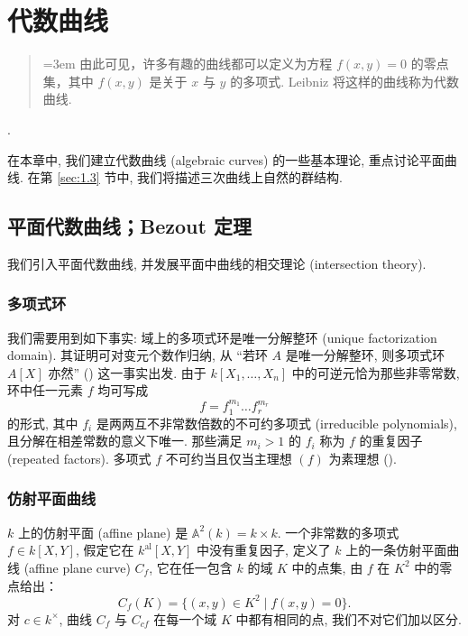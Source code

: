\chapter{代数曲线}\label{ch:1}

\begin{quote}\small\itshape
{\emergencystretch=3em 由此可见，许多有趣的曲线都可以定义为方程 $f(x,y)=0$ 的零点集，其中 $f(x,y)$ 是关于 $x$ 与 $y$ 的多项式. Leibniz 将这样的曲线称为代数曲线.\par}
\end{quote}
\vspace{-0.5em}
\hfill \small \cite[p.~78]{brieskorn1986}.

在本章中, 我们建立代数曲线 (algebraic curves) 的一些基本理论, 重点讨论平面曲线. 在第 \ref{sec:1.3} 节中, 我们将描述三次曲线上自然的群结构.

\section{平面代数曲线；Bezout 定理}\label{sec:1.1}

我们引入平面代数曲线, 并发展平面中曲线的相交理论 (intersection theory).

\subsection*{多项式环}

我们需要用到如下事实: 域上的多项式环是唯一分解整环 (unique factorization domain). 其证明可对变元个数作归纳, 从 ``若环 $A$ 是唯一分解整环, 则多项式环 $A[X]$ 亦然'' (\cite[4.9]{milne-ca}) 这一事实出发. 由于 $k[X_1,\dots,X_n]$ 中的可逆元恰为那些非零常数, 环中任一元素 $f$ 均可写成
\[
f = f_1^{m_1}\dots f_r^{m_r}
\]
的形式, 其中 $f_i$ 是两两互不非常数倍数的不可约多项式 (irreducible polynomials), 且分解在相差常数的意义下唯一. 那些满足 $m_i > 1$ 的 $f_i$ 称为 $f$ 的重复因子 (repeated factors). 多项式 $f$ 不可约当且仅当主理想 $(f)$ 为素理想 (\cite[4.1]{milne-ca}).

\subsection*{仿射平面曲线}

$k$ 上的仿射平面 (affine plane) 是 $\mathbb{A}^2(k) = k\times k$. 一个非常数的多项式 $f\in k[X,Y]$, 假定它在 $k^{\mathrm{al}}[X,Y]$ 中没有重复因子, 定义了 $k$ 上的一条仿射平面曲线 (affine plane curve) $C_f$, 它在任一包含 $k$ 的域 $K$ 中的点集, 由 $f$ 在 $K^2$ 中的零点给出：
\[
C_f(K) = \{(x,y)\in K^2 \mid f(x,y) = 0\}.
\]
对 $c\in k^{\times}$, 曲线 $C_f$ 与 $C_{cf}$ 在每一个域 $K$ 中都有相同的点, 我们不对它们加以区分.

